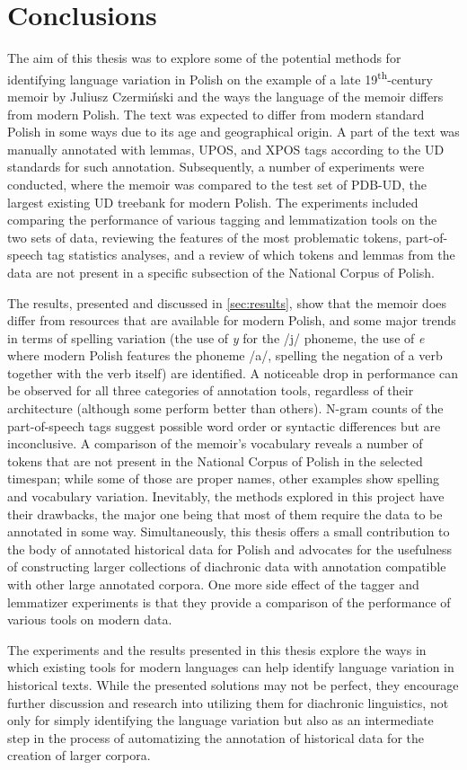 \section{Conclusions}
\label{sec:conclusions}

The aim of this thesis was to explore some of the potential methods for identifying language variation in Polish on the example of a late 19\textsuperscript{th}-century memoir by Juliusz Czermiński and the ways the language of the memoir differs from modern Polish. The text was expected to differ from modern standard Polish in some ways due to its age and geographical origin. A part of the text was manually annotated with lemmas, UPOS, and XPOS tags according to the UD standards for such annotation. Subsequently, a number of experiments were conducted, where the memoir was compared to the test set of PDB-UD, the largest existing UD treebank for modern Polish. The experiments included comparing the performance of various tagging and lemmatization tools on the two sets of data, reviewing the features of the most problematic tokens, part-of-speech tag statistics analyses, and a review of which tokens and lemmas from the data are not present in a specific subsection of the National Corpus of Polish.

The results, presented and discussed in \autoref{sec:results}, show that the memoir does differ from resources that are available for modern Polish, and some major trends in terms of spelling variation (the use of \textit{y} for the /j/ phoneme, the use of \textit{e} where modern Polish features the phoneme /a/, spelling the negation of a verb together with the verb itself) are identified. A noticeable drop in performance can be observed for all three categories of annotation tools, regardless of their architecture (although some perform better than others). N-gram counts of the part-of-speech tags suggest possible word order or syntactic differences but are inconclusive. A comparison of the memoir's vocabulary reveals a number of tokens that are not present in the National Corpus of Polish in the selected timespan; while some of those are proper names, other examples show spelling and vocabulary variation. Inevitably, the methods explored in this project have their drawbacks, the major one being that most of them require the data to be annotated in some way. Simultaneously, this thesis offers a small contribution to the body of annotated historical data for Polish and advocates for the usefulness of constructing larger collections of diachronic data with annotation compatible with other large annotated corpora. One more side effect of the tagger and lemmatizer experiments is that they provide a comparison of the performance of various tools on modern data.

The experiments and the results presented in this thesis explore the ways in which existing tools for modern languages can help identify language variation in historical texts. While the presented solutions may not be perfect, they encourage further discussion and research into utilizing them for diachronic linguistics, not only for simply identifying the language variation but also as an intermediate step in the process of automatizing the annotation of historical data for the creation of larger corpora. 